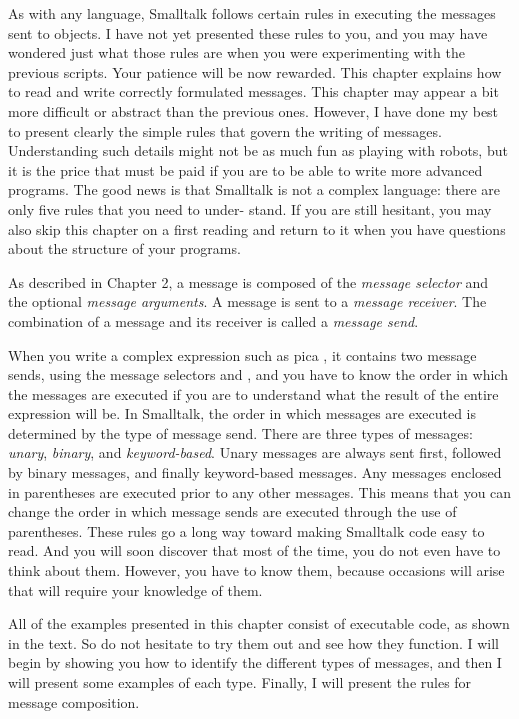 \documentclass[a4paper,10pt,twoside]{book}
\begin{document}
As with any language, Smalltalk follows certain rules in executing the messages sent to 
objects. I have not yet presented these rules to you, and you may have wondered just what 
those rules are when you were experimenting with the previous scripts. Your patience will be 
now rewarded. This chapter explains how to read and write correctly formulated messages. 
This chapter may appear a bit more difficult or abstract than the previous ones. However, 
I have done my best to present clearly the simple rules that govern the writing of messages. 
Understanding such details might not be as much fun as playing with robots, but it is the 
price that must be paid if you are to be able to write more advanced programs. The good news 
is that Smalltalk is not a complex language: there are only five rules that you need to under- 
stand. If you are still hesitant, you may also skip this chapter on a first reading and return to it 
when you have questions about the structure of your programs. 

As described in Chapter 2, a message is composed of the \emph{message selector} and the optional 
\emph{message arguments}. A message is sent to a \emph{message receiver}. The combination of a message and 
its receiver is called a \emph{message send}. 

When you write a complex expression such as pica , it contains two message 
sends, using the message selectors  and \ct{+}, and you have to know the order in which the 
messages are executed if you are to understand what the result of the entire expression will be. 
In Smalltalk, the order in which messages are executed is determined by the type of message 
send. There are three types of messages: \emph{unary}, \emph{binary}, and \emph{keyword-based}. Unary messages 
are always sent first, followed by binary messages, and finally keyword-based messages. Any 
messages enclosed in parentheses are executed prior to any other messages. This means that 
you can change the order in which message sends are executed through the use of parentheses. 
These rules go a long way toward making Smalltalk code easy to read. And you will soon 
discover that most of the time, you do not even have to think about them. However, you have 
to know them, because occasions will arise that will require your knowledge of them. 

All of the examples presented in this chapter consist of executable code, as shown in the 
text. So do not hesitate to try them out and see how they function. I will begin by showing you 
how to identify the different types of messages, and then I will present some examples of each 
type. Finally, I will present the rules for message composition. 
\end{document}
